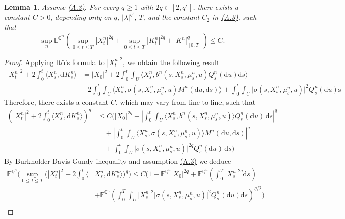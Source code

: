 \documentclass[11pt,amsfonts]{article}
\theoremstyle{plain}
\newtheorem{lemma}{Lemma}
\theoremstyle{assumpstyle}
\numberwithin{equation}{section}
\numberwithin{theorem}{section}
\numberwithin{proposition}{section}
\numberwithin{definition}{section}
\numberwithin{remark}{section}
\numberwithin{corollary}{section}
\numberwithin{lemma}{section}
\begin{document}
\begin{lemma} \label{lemma1}
Assume \hyperlink{A.3}{(A.3)}. For every $ q \ge 1 $ with $2q \in [2, q'] $, there exists a constant $ C > 0 $, depending only on $ q $, $ |\lambda|^{q'} $, $ T $, and the constant $ C_2 $ in \hyperlink{A.3}{(A.3)}, such that
\begin{equation} \label{eq3.1}
\sup_n \mathbb{E}^{\mathbb{Q}^n} \left( \sup_{0 \leq t \leq T} |X^n_t|^{2q} + \sup_{0 \leq t \leq T} |K^n_t|^{2q} + |K^n|^q_{[0,T]} \right) \leq C.
\end{equation}
\end{lemma}
\begin{proof}
Applying Itô’s formula to $ |X^n_t|^2 $, we obtain the following result
\begin{align*}
|X^n_t|^2+2\displaystyle\int_{0}^{t}\big\langle X^n_s,\mathrm{d}K^n_s \big\rangle &= |X_{0}|^2 +2\displaystyle\int_0^t\int_{U}^{}\big\langle X^n_s, b^n(s,X^n_s,\mu^n_s,u)Q^n_s(\mathrm{d}u)\mathrm{d}s\big\rangle\\
&+2 \int_0^t\int_{U}^{} \big\langle X^n_s,\sigma(s,X^n_s, \mu^n_s, u)M^n(\mathrm{d}u,\mathrm{d}s)\big\rangle 
+\int_{0}^{t} \int_{U}^{}\big|\sigma(s,X^n_s, \mu^n_s, u)\big|^2Q^n_s(\mathrm{d}u)\mathrm{s}
\end{align*}
Therefore, there exists a constant $ C$, which may vary from line to line, such that
\begin{align*}
\left( |X^n_t|^2 + 2\int_0^t \langle X^n_s, \mathrm{d}K^n_s \rangle \right)^q 
&\leq C \Bigg( |X_0|^{2q}+
\left| \int_0^t \int_U \langle X^n_s, b^n(s, X^n_s, \mu^n_s, u) \rangle Q^n_s(\mathrm{d}u) \, \mathrm{d}s \right|^q \\
&\quad + \left| \int_0^t \int_U \big\langle X^n_s, \sigma(s, X^n_s, \mu^n_s, u) \big\rangle M^n(\mathrm{d}u, \mathrm{d}s) \right|^q \\
&\quad + \int_0^t \int_U \big|\sigma(s, X^n_s, \mu^n_s, u)\big|^{2q} Q^n_s(\mathrm{d}u) \, \mathrm{d}s 
\Bigg)
\end{align*}
By Burkholder-Davis-Gundy inequality and assumption \hyperlink{A.3}{(A.3)} we deduce 
\begin{equation}
\begin{split}
\mathbb{E}^{\mathbb{Q}^n}\Big( \sup_{ 0 \leq t \leq T} \Big(|X^n_t|^2+2\int_{0}^{t}\langle & X^n_s, \mathrm{d}K^n_s \rangle \Big)^q \Big) \leq C\Bigg(1+\mathbb{E}^{\mathbb{Q}^n}|X_0|^{2q}+ \mathbb{E}^{\mathbb{Q}^n}\left( \int_{0}^{T} |X^n_s|^{2q} \mathrm{d}s \right)\\
&+ \mathbb{E}^{\mathbb{Q}^n}\left( \int_0^T\int_{U}^{} \big|X^n_s\big|^2\big|\sigma(s,X^n_s, \mu^n_s, u)\big|^2Q^n_s(\mathrm{d}u)\mathrm{d}s\right)^{q/2}\Bigg)\\

\end{split}
\end{equation}
\end{proof}
\end{document}
